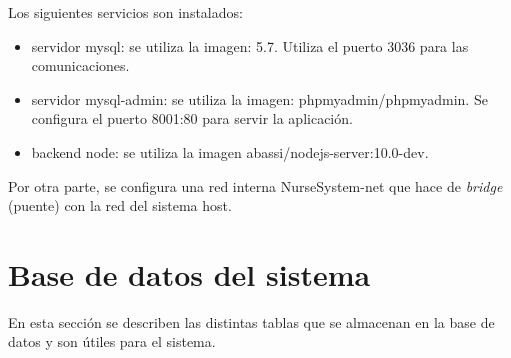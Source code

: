 Los siguientes servicios son instalados:

\begin{itemize}
\item servidor mysql: se utiliza la imagen: 5.7. Utiliza el puerto 3036 para las comunicaciones. 
\item servidor mysql-admin: se utiliza la imagen: phpmyadmin/phpmyadmin. Se configura el puerto 8001:80 para servir la aplicación.
\item backend node: se utiliza la imagen abassi/nodejs-server:10.0-dev.
\end{itemize}

Por otra parte, se configura una red interna NurseSystem-net que hace de \textit{bridge} (puente) con la red del sistema host.



\section{Base de datos del sistema}
En esta sección se describen las distintas tablas que se almacenan en la base de datos y son útiles para el sistema.  


